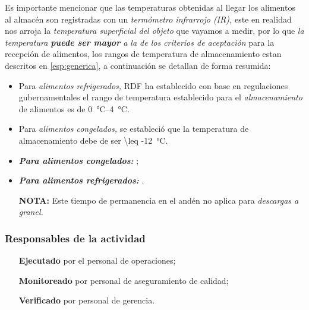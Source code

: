 

\begin{note}
	Es importante mencionar que las temperaturas obtenidas al llegar los alimentos al almacén son registradas con un \emph{termómetro infrarrojo (IR),} este en realidad nos arroja la \emph{temperatura superficial del objeto} que vayamos a medir, por lo que \emph{la temperatura \textbf{puede ser mayor} a la de los criterios de aceptación} para la recepción de alimentos, los rangos de temperatura de almacenamiento estan descritos en \cref{esp:generica}, a continuación se detallan de forma resumida:
	\begin{itemize}
		\item Para \emph{alimentos refrigerados,} \gls{RDF} ha establecido con base en regulaciones gubernamentales el rango de temperatura establecido para el \emph{almacenamiento} de alimentos es de \qtyrange{0}{4}{\degreeCelsius}.
		\item Para \emph{alimentos congelados,} se estableció que la temperatura de almacenamiento debe de ser \qty{\leq -12}{\degreeCelsius}.
	\end{itemize}
\end{note}



\begin{note}\label{TiempoDePermanencia-Anden}
	\begin{itemize}
		\item \emph{\textbf{Para alimentos congelados:}} \TiempoAndenCong;
		\item \emph{\textbf{Para alimentos refrigerados:}} \TiempoAndenRefri.
		\item[\textbf{NOTA:}] Este tiempo de permanencia en el andén no aplica para \emph{descargas a granel.}
	\end{itemize}
\end{note}

\subsubsection{Responsables de la actividad}
\begin{itemize}
	\item[\textbf{Ejecutado}] por el personal de operaciones;
	\item[\textbf{Monitoreado}] por personal de aseguramiento de calidad;
	\item[\textbf{Verificado}] por personal de gerencia.
\end{itemize}

